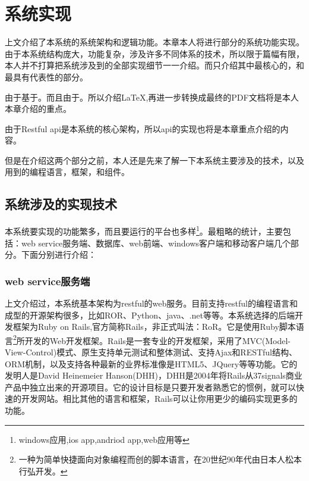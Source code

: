 
\chapter{系统实现}
\label{chap:achieve}

上文介绍了本系统的系统架构和逻辑功能。本章本人将进行部分的系统功能实现。由于本系统结构庞大，功能复杂，涉及许多不同体系的技术，所以限于篇幅有限，本人并不打算把系统涉及到的全部实现细节一一介绍。而只介绍其中最核心的，和最具有代表性的部分。

由于基于。而且由于。所以介绍\LaTeX,再进一步转换成最终的PDF文档将是本人本章介绍的重点。

由于Restful api\cite{richardson2008restful,allamaraju2010restful,fielding2000architectural,pautasso2008restful,story2009foaf}是本系统的核心架构，所以api的实现也将是本章重点介绍的内容。

但是在介绍这两个部分之前，本人还是先来了解一下本系统主要涉及的技术，以及用到的编程语言，框架，和组件。

\section{系统涉及的实现技术}
\label{sec:language}

本系统要实现的功能繁多，而且要运行的平台也多样\footnote{windows应用,ios app,andriod app,web应用等}。最粗略的统计，主要包括：web service服务端、数据库、web前端、windows客户端和移动客户端几个部分。下面分别进行介绍：

\subsection{web service服务端}
\label{sec:webservice}

上文介绍过，本系统基本架构为restful的web服务。目前支持restful的编程语言和成型的开源架构很多，比如ROR、Python、java、.net等等。本系统选择的后端开发框架为Ruby on Rails,官方简称Rails\cite{ruby2009agile,hartl2012ruby}，非正式叫法：RoR。它是使用Ruby\cite{thomas2004programming}脚本语言\footnote{一种为简单快捷面向对象编程而创的脚本语言，在20世纪90年代由日本人松本行弘开发。}所开发的Web开发框架。Rails是一套专业的开发框架，采用了MVC(Model-View-Control)模式、原生支持单元测试和整体测试、支持Ajax和RESTful结构、ORM机制，以及支持各种最新的业界标准像是HTML5、JQuery等等功能。它的发明人是David Heinemeier Hanson(DHH)，DHH是2004年将Rails从37signals商业产品中独立出来的开源项目。它的设计目标是只要开发者熟悉它的惯例，就可以快速的开发网站。相比其他的语言和框架，Rails可以让你用更少的编码实现更多的功能。

